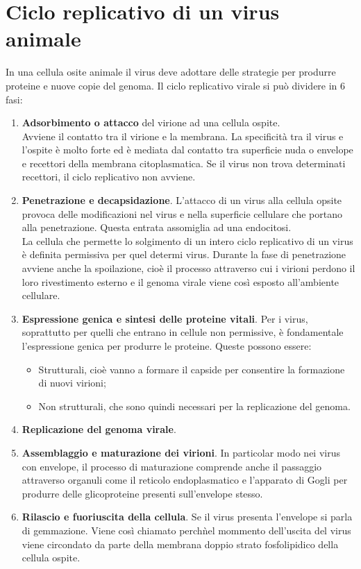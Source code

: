 \section{Ciclo replicativo di un virus animale}
In una cellula osite animale il virus deve adottare delle strategie per produrre proteine e nuove copie del genoma. Il ciclo replicativo virale si pu\`o dividere in 6 fasi:
\begin{enumerate}
    \item \textbf{Adsorbimento o attacco} del virione ad una cellula ospite. 
    \\Avviene il contatto tra il virione e la membrana. La specificit\`a tra il virus e l'ospite \`e molto forte ed \`e mediata dal contatto tra superficie nuda o envelope e recettori della membrana citoplasmatica. Se il virus non trova determinati recettori, il ciclo replicativo non avviene.
    \item \textbf{Penetrazione e decapsidazione}. L'attacco di un virus alla cellula opsite provoca delle modificazioni nel virus e nella superficie cellulare che portano alla penetrazione. Questa entrata assomiglia ad una endocitosi. 
    \\La cellula che permette lo solgimento di un intero ciclo replicativo di un virus \`e definita permissiva per quel determi virus. Durante la fase di penetrazione avviene anche la spoilazione, cio\`e il processo attraverso cui i virioni perdono il loro rivestimento esterno e il genoma virale viene cos\`i esposto all'ambiente cellulare.
    \item \textbf{Espressione genica e sintesi delle proteine vitali}. Per i virus, soprattutto per quelli che entrano in cellule non permissive, \`e fondamentale l'espressione genica per produrre le proteine. Queste possono essere: 
    \begin{itemize}
        \item Strutturali, cio\`e vanno a formare il capside per consentire la formazione di nuovi virioni; 
        \item Non strutturali, che sono quindi necessari per la replicazione del genoma. 
    \end{itemize}
    \item \textbf{Replicazione del genoma virale}.
    \item \textbf{Assemblaggio e maturazione dei virioni}. In particolar modo nei virus con envelope, il processo di maturazione comprende anche il passaggio attraverso organuli come il reticolo endoplasmatico e l'apparato di Gogli per produrre delle glicoproteine presenti sull'envelope stesso.
    \item \textbf{Rilascio e fuoriuscita della cellula}. Se il virus presenta l'envelope si parla di gemmazione. Viene cos\`i chiamato perch\` nel mommento dell'uscita del virus viene circondato da parte della membrana doppio strato fosfolipidico della cellula ospite.
\end{enumerate}
